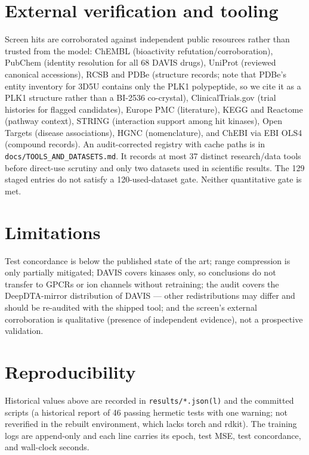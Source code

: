 \documentclass[11pt]{article}
\begin{document}
\section{External verification and tooling}
Screen hits are corroborated against independent public resources rather
than trusted from the model: ChEMBL (bioactivity refutation/corroboration),
PubChem (identity resolution for all 68 DAVIS drugs), UniProt (reviewed
canonical accessions), RCSB and PDBe (structure records; note that PDBe's entity inventory for
3D5U contains only the PLK1 polypeptide, so we cite it as a PLK1 structure
rather than a BI-2536 co-crystal), ClinicalTrials.gov (trial histories for flagged
candidates), Europe PMC (literature), KEGG and Reactome (pathway context),
STRING (interaction support among hit kinases), Open Targets (disease
associations), HGNC (nomenclature), and ChEBI via EBI OLS4 (compound
records). An audit-corrected registry with cache paths is in
\texttt{docs/TOOLS\_AND\_DATASETS.md}. It records at most 37 distinct
research/data tools before direct-use scrutiny and only two datasets
used in scientific results. The 129 staged entries do not satisfy a
120-used-dataset gate. Neither quantitative gate is met.
\section{Limitations}
Test concordance is below the published state of the art; range
compression is only partially mitigated; DAVIS covers kinases only, so
conclusions do not transfer to GPCRs or ion channels without retraining;
the audit covers the DeepDTA-mirror distribution of DAVIS --- other
redistributions may differ and should be re-audited with the shipped tool;
and the screen's external corroboration is qualitative (presence of
independent evidence), not a prospective validation.
\section{Reproducibility}
Historical values above are recorded in \texttt{results/*.json(l)} and the
committed scripts (a historical report of 46 passing hermetic tests with one warning;
not reverified in the rebuilt environment, which lacks torch and rdkit). The training
logs are append-only and each line carries its epoch, test MSE, test
concordance, and wall-clock seconds.
\end{document}
